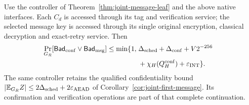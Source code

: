 \begin{proposition}
\label{prop:confirmation-message-auth}
Use the controller of Theorem~\ref{thm:joint-message-leaf} and the above
native interfaces. Each $C_d$ is accessed through its tag and verification
service; the selected message key is accessed through its single original
encryption, classical decryption and exact-retry service. Then
\begin{equation}
\begin{split}
 \Pr_{G_R}[\mathsf{Bad}_{\rm conf}\lor\mathsf{Bad}_{\rm msg}]
 \le\min\{1,\;&\Delta_{\rm sched}+\Delta_{\rm conf}
       +V2^{-256}\\
       &+\chi_H(Q_H^{\rm conf})+\varepsilon_{\rm INT}\}.
\end{split}
\label{eq:confirmation-message-auth}
\end{equation}
The same controller retains the qualified confidentiality bound
$|\mathbb E_{G_R}Z|\le2\Delta_{\rm sched}
 +2\varepsilon_{\rm AEAD}$ of
Corollary~\ref{cor:joint-first-message}. Its confirmation and verification
operations are part of that complete continuation.
\end{proposition}
